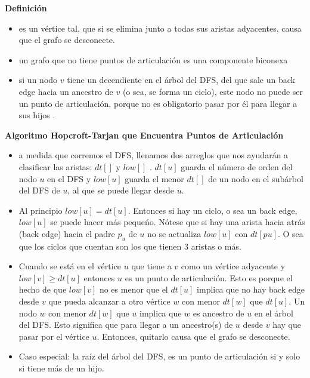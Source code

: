 \textbf{Definici\'on}
\begin{itemize}
	\item{ es un v\'ertice tal, que si se elimina junto a todas sus aristas adyacentes, causa que el 
		grafo se desconecte. }
	\item{ un grafo que no tiene puntos de articulaci\'on es una componente biconexa}
	\item{ si un nodo $v$ tiene un decendiente en el \'arbol del DFS, del que sale un back edge hacia 
		un ancestro de $v$ (o sea, se forma un ciclo), este nodo no puede ser un punto de articulaci\'on, 
		porque no es obligatorio pasar por \'el para llegar a sus hijos .
	}
\end{itemize}

\textbf{Algoritmo Hopcroft-Tarjan que Encuentra Puntos de Articulaci\'on}
\begin{itemize}
	\item{ 
		a medida que corremos el DFS, llenamos dos arreglos que nos ayudar\'an a clasificar las aristas: $dt[]$ y
		$low[]$ . $dt[u]$ guarda el n\'umero de orden del nodo $u$ en el DFS y $low[u]$ guarda el menor $dt[]$ de un nodo en el
		sub\'arbol del DFS de $u$, al que se puede llegar desde $u$. 
	}
	\item{
		Al principio $low[u] = dt[u]$. Entonces si hay un ciclo, o sea un back edge, $low[u]$ se puede hacer m\'as peque\'no. 
		N\'otese que si hay una arista hacia atr\'as (back edge) hacia el padre $p_u$ de $u$ no se actualiza $low[u]$ con $dt[pu]$. 
		O sea que los ciclos que cuentan son los que tienen $3$ aristas o m\'as.
    }
    \item{
		Cuando se est\'a en el v\'ertice $u$ que tiene a $v$ como un v\'ertice adyacente y $low[v] \geq dt[u]$ entonces $u$ es un
		punto de articulaci\'on. Esto es porque el hecho de que $low[v]$ no es menor que el $dt[u]$ implica que no hay
		back edge desde $v$ que pueda alcanzar a otro v\'ertice $w$ con menor $dt[w]$ que $dt[u]$. Un nodo $w$ con
		menor $dt[w]$ que $u$ implica que $w$ es ancestro de $u$ en el árbol del DFS. Esto significa que para llegar a un ancestro(s) 
		de $u$ desde $v$ hay que pasar por el v\'ertice $u$. Entonces, quitarlo causa que el grafo se desconecte.
    }
    \item{
		Caso especial: la ra\'iz del \'arbol del DFS, es un punto de articulaci\'on si y solo si tiene m\'as de un hijo.
    }
\end{itemize}

